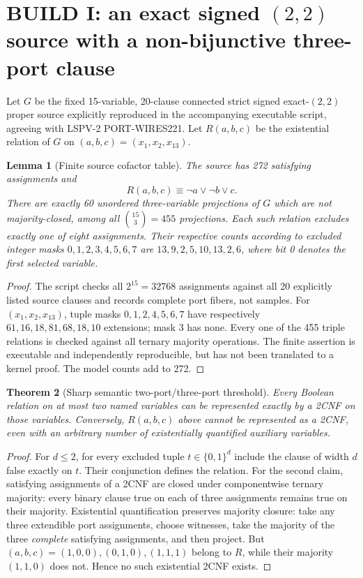 \documentclass[11pt]{article}
\newtheorem{theorem}{Theorem}
\newtheorem{lemma}[theorem]{Lemma}
\begin{document}
\section{BUILD I: an exact signed $(2,2)$ source with a non-bijunctive three-port clause}
Let $G$ be the fixed 15-variable, 20-clause connected strict signed exact-$(2,2)$ proper source explicitly reproduced in the accompanying executable script, agreeing with LSPV-2 PORT-WIRES221. Let $R(a,b,c)$ be the existential relation of $G$ on $(a,b,c)=(x_1,x_2,x_{13})$.
\begin{lemma}[Finite source cofactor table]\label{lem:source}
The source has 272 satisfying assignments and
\[
\boxed{R(a,b,c)\equiv \neg a\vee\neg b\vee c.}
\]
There are exactly 60 unordered three-variable projections of $G$ which are not majority-closed, among all $\binom{15}{3}=455$ projections. Each such relation excludes exactly one of eight assignments. Their respective counts according to excluded integer masks $0,1,2,3,4,5,6,7$ are $13,9,2,5,10,13,2,6$, where bit 0 denotes the first selected variable.
\end{lemma}
\begin{proof}
The script checks all $2^{15}=32768$ assignments against all 20 explicitly listed source clauses and records complete port fibers, not samples. For $(x_1,x_2,x_{13})$, tuple masks $0,1,2,4,5,6,7$ have respectively $61,16,18,81,68,18,10$ extensions; mask $3$ has none. Every one of the 455 triple relations is checked against all ternary majority operations. The finite assertion is executable and independently reproducible, but has not been translated to a kernel proof. The model counts add to 272.
\end{proof}

\begin{theorem}[Sharp semantic two-port/three-port threshold]\label{thm:threshold}
Every Boolean relation on at most two named variables can be represented exactly by a 2CNF on those variables. Conversely, $R(a,b,c)$ above cannot be represented as a 2CNF, \emph{even with an arbitrary number of existentially quantified auxiliary variables}.
\end{theorem}
\begin{proof}
For $d\le2$, for every excluded tuple $t\in\{0,1\}^d$ include the clause of width $d$ false exactly on $t$. Their conjunction defines the relation. For the second claim, satisfying assignments of a 2CNF are closed under componentwise ternary majority: every binary clause true on each of three assignments remains true on their majority. Existential quantification preserves majority closure: take any three extendible port assignments, choose witnesses, take the majority of the three \emph{complete} satisfying assignments, and then project. But $(a,b,c)=(1,0,0),(0,1,0),(1,1,1)$ belong to $R$, while their majority $(1,1,0)$ does not. Hence no such existential 2CNF exists.
\end{proof}
\end{document}
